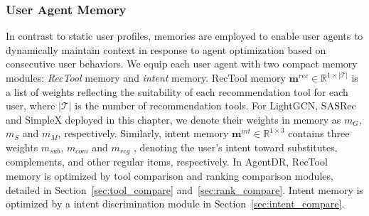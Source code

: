 \subsubsection{User Agent Memory}
In contrast to static user profiles, memories are employed to enable user agents to dynamically maintain context in response to agent optimization based on consecutive user behaviors. 
We equip each user agent with two compact memory modules: \textit{RecTool} memory and \textit{intent} memory. RecTool memory $\mathbf{m}^{rec}\in\mathbb{R}^{1\times |\mathcal{T}|}$ is a list of weights reflecting the suitability of each recommendation tool for each user, where $|\mathcal{T}|$ is the number of recommendation tools. For LightGCN, SASRec and SimpleX deployed in this chapter, we denote their weights in memory as $m_G$, $m_S$ and $m_M$, respectively. Similarly, intent memory $\mathbf{m}^{int}\in\mathbb{R}^{1\times 3}$ contains three weights $m_{sub}$, $m_{com}$ and $m_{reg}$ , denoting the user's intent toward substitutes, complements, and other regular items, respectively. In AgentDR, RecTool memory is optimized by tool comparison and ranking comparison modules, detailed in Section~\ref{sec:tool_compare} and~\ref{sec:rank_compare}. Intent memory is optimized by a intent discrimination module in Section~\ref{sec:intent_compare}.

